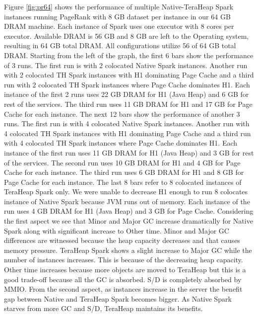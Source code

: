 Figure \ref{fig:pr64} shows the performance of multiple
Native-TeraHeap Spark instances running PageRank with 8 GB
dataset per instance in our 64 GB DRAM machine. Each instance of Spark
uses one executor with 8 cores per executor. Available DRAM is 56 GB
and 8 GB are left to the Operating system, resulting in 64 GB total
DRAM. All configurations utilize 56 of 64 GB total DRAM.
Starting from the left of the graph, the first 6 bars show the
performance of 3 runs. The first run is with 2 colocated Native Spark instances.
Another run with 2 colocated TH Spark instances with H1 dominating Page Cache
and a third run with 2 colocated TH Spark instances where Page Cache dominates H1.
Each instance of the first 2 runs uses 22 GB DRAM for H1 (Java Heap) and 6 GB for rest of the services.
The third run uses 11 GB DRAM for H1 and 17 GB for Page Cache for each instance. 
The next 12 bars show the performance of another 3 runs. The first run is with 4 colocated Native Spark instances.
Another run with 4 colocated TH Spark instances with H1 dominating Page Cache
and a third run with 4 colocated TH Spark instances where Page Cache dominates H1.
Each instance of the first run uses 11 GB DRAM for H1 (Java Heap) and 3 GB for rest of the services.
The second run uses 10 GB DRAM for H1 and 4 GB for Page Cache for each instance.
The third run uses 6 GB DRAM for H1 and 8 GB for Page Cache for each instance.
The last 8 bars refer to 8 colocated instances of TeraHeap Spark only. 
We were unable to decrease H1 enough to run 8 colocates instance of Native Spark
because JVM runs out of memory. Each instance of the run uses 4 GB DRAM for H1 (Java Heap) and 3 GB for Page Cache.
Considering the first aspect we see that Minor and Major GC increase dramatically for Native Spark along with significant increase to Other time. Minor and Major GC differences are witnessed because the heap capacity decreases and that causes memory pressure. TeraHeap Spark shows a slight increase to Major GC while the number of instances increases. This is because of the decreasing heap capacity. Other time increases because more objects are moved to TeraHeap but this is a good trade-off because all the GC is absorbed. S/D is completely absorbed by MMIO. From the second aspect, as instances increase in the server the benefit gap between Native and TeraHeap Spark becomes bigger. As Native Spark starves from more GC and S/D, TeraHeap maintains its benefits.

